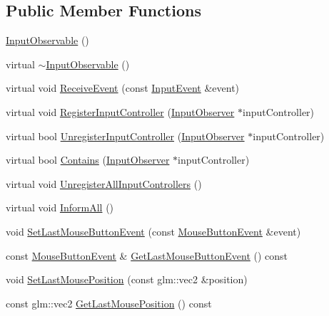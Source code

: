\subsection*{Public Member Functions}
\begin{DoxyCompactItemize}
\item 
\mbox{\hyperlink{classngl_1_1_input_observable_a3f78b733a8b0d8f4c039e4c977b8098c}{Input\+Observable}} ()
\item 
virtual \mbox{\hyperlink{classngl_1_1_input_observable_ac110c5cab3fbb5298dd1a4022c184450}{$\sim$\+Input\+Observable}} ()
\item 
virtual void \mbox{\hyperlink{classngl_1_1_input_observable_ae9a83d0603d7a33d12c5eee698d013fd}{Receive\+Event}} (const \mbox{\hyperlink{structngl_1_1_input_event}{Input\+Event}} \&event)
\item 
virtual void \mbox{\hyperlink{classngl_1_1_input_observable_abb9cad70a9f558b70fc6a6d2892876b1}{Register\+Input\+Controller}} (\mbox{\hyperlink{classngl_1_1_input_observer}{Input\+Observer}} $\ast$input\+Controller)
\item 
virtual bool \mbox{\hyperlink{classngl_1_1_input_observable_a16e55c61b3df2123674f6b4f41f29711}{Unregister\+Input\+Controller}} (\mbox{\hyperlink{classngl_1_1_input_observer}{Input\+Observer}} $\ast$input\+Controller)
\item 
virtual bool \mbox{\hyperlink{classngl_1_1_input_observable_ad47a058c9d9e1e0758d8eb52f74dce61}{Contains}} (\mbox{\hyperlink{classngl_1_1_input_observer}{Input\+Observer}} $\ast$input\+Controller)
\item 
virtual void \mbox{\hyperlink{classngl_1_1_input_observable_afddd12665c009fceca2c92fe8968da4e}{Unregister\+All\+Input\+Controllers}} ()
\item 
virtual void \mbox{\hyperlink{classngl_1_1_input_observable_a813a825640b68227dd5bb7d8f007fe9d}{Inform\+All}} ()
\item 
void \mbox{\hyperlink{classngl_1_1_input_observable_a435409dab4bc521beb78d27876897bc9}{Set\+Last\+Mouse\+Button\+Event}} (const \mbox{\hyperlink{structngl_1_1_mouse_button_event}{Mouse\+Button\+Event}} \&event)
\item 
const \mbox{\hyperlink{structngl_1_1_mouse_button_event}{Mouse\+Button\+Event}} \& \mbox{\hyperlink{classngl_1_1_input_observable_a2992097e3862eabce344d9f5a0e8e7dc}{Get\+Last\+Mouse\+Button\+Event}} () const
\item 
void \mbox{\hyperlink{classngl_1_1_input_observable_afd2a7ee2e78281cea8492fa8bd8dd5ab}{Set\+Last\+Mouse\+Position}} (const glm\+::vec2 \&position)
\item 
const glm\+::vec2 \mbox{\hyperlink{classngl_1_1_input_observable_a8cfb36d8648393c893bc7ebe5fa322cf}{Get\+Last\+Mouse\+Position}} () const
\end{DoxyCompactItemize}

